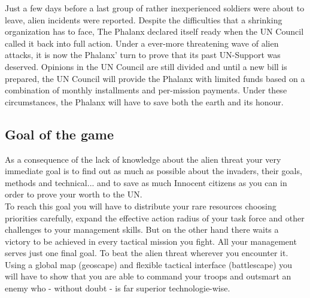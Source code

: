 Just a few days before a last group of rather inexperienced soldiers were about to leave, alien incidents were reported. Despite the difficulties that a shrinking organization has to face, The Phalanx declared itself ready when the UN Council called it back into full action. Under a ever-more threatening wave of alien attacks, it is now the Phalanx' turn to prove that its past UN-Support was deserved. Opinions in the UN Council are still divided and until a new bill is prepared, the UN Council will provide the Phalanx with limited funds based on a combination of monthly installments and per-mission payments. Under these circumstances, the Phalanx will have to save both the earth and its honour.

\subsection{Goal of the game}
As a consequence of the lack of knowledge about the alien threat your very immediate goal is to find out as much as possible about the invaders, their goals, methods and technical... and to save as much Innocent citizens as you can in order to prove your worth to the UN.\\
To reach this goal you will have to distribute your rare resources choosing priorities carefully, expand the effective action radius of your task force and other challenges to your management skills. But on the other hand there waits a victory to be achieved in every tactical mission you fight. All your management serves just one final goal. To beat the alien threat wherever you encounter it. Using a global map (geoscape) and flexible tactical interface (battlescape) you will have to show that you are able to command your troops and outsmart an enemy who - without doubt - is far superior technologie-wise.
